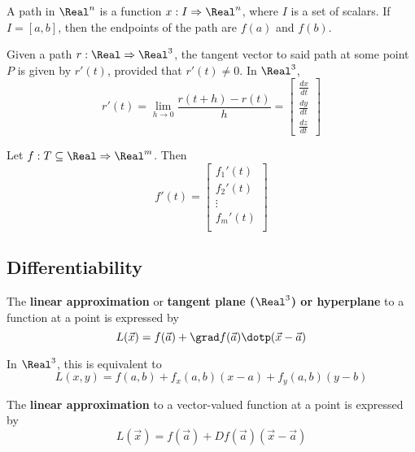 
\begin{definition}[Path]
  A path in $\Real^n$ is a function $x : I \Rightarrow \Real^n$, where $I$ is a set of scalars. If $I = [a, b]$, then the endpoints of the path are $f(a)$ and $f(b)$.
\end{definition}

\begin{definition}
  Given a path $r : \Real \Rightarrow \Real^3$, the tangent vector to said path at some point $P$ is given by $r'(t)$, provided that $r'(t) \neq 0$. In $\Real^3$,
  \[
    r'(t) = \lim_{h \to 0} \frac{r(t + h) - r(t)}{h} = \begin{bmatrix}
      \frac{dx}{dt} \\
      \frac{dy}{dt} \\
      \frac{dz}{dt}
    \end{bmatrix}
  \]
\end{definition}

\begin{definition}
  Let $f : T \subseteq \Real \Rightarrow \Real^m$. Then
  \[
    f'(t) = \begin{bmatrix}
      f_1'(t) \\
      f_2'(t) \\
      \vdots \\
      f_m'(t) \\
    \end{bmatrix}
  \]
\end{definition}

\subsection{Differentiability}

\begin{definition}
  The \textbf{linear approximation} or \textbf{tangent plane ($\Real^3$) or hyperplane} to a function at a point is expressed by
  \[
    L(\vec{x}) = f(\vec{a}) + \grad f(\vec{a}) \dotp (\vec{x} - \vec{a})
  \]

  In $\Real^3$, this is equivalent to
  \[
    L(x, y) = f(a, b) + f_x(a, b) (x - a) + f_y(a, b) (y - b)
  \]
\end{definition}

\begin{definition}
  The \textbf{linear approximation} to a vector-valued function at a point is expressed by
  \[
    L(\vec{x}) = f(\vec{a}) + Df(\vec{a})(\vec{x} - \vec{a})
  \]
\end{definition}


